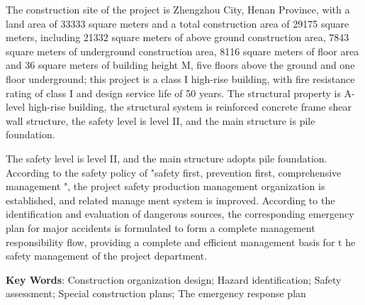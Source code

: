     The construction site of the project is Zhengzhou City, Henan Province, with a land area of 33333 square meters and a total construction area of 29175 square meters, 
    including 21332 square meters of above ground construction area, 7843 square meters of underground construction area, 8116 square meters of floor area and 36 square 
    meters of building height M, five floors above the ground and one floor underground; this project is a class I high-rise building, with fire resistance rating of 
    class I and design service life of 50 years. The structural property is A-level high-rise building, the structural system is reinforced concrete frame shear wall 
    structure, the safety level is level II, and the main structure is pile foundation.
    
    The safety level is level II, and the main structure adopts pile foundation.
   According to the safety policy of "safety first, prevention first, comprehensive management ", the project safety production management 
   organization is established, and related manage ment system is improved. According to the identification and evaluation of dangerous sources,
    the corresponding emergency plan for major accidents is formulated to form a complete management responsibility flow, providing a complete 
    and efficient management basis for t he safety management of the project department.


{  \textbf{Key Words}: Construction organization design; Hazard identification; Safety assessment; Special construction plans; The emergency response plan}
\pagestyle{fancy}



